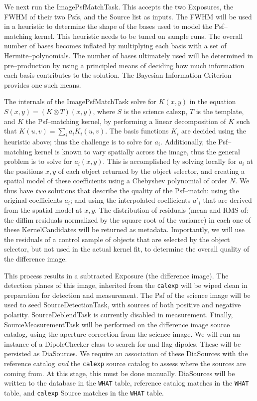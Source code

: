 \documentclass[12pt]{article}
\begin{document}
We next run the ImagePsfMatchTask.  This accepts the two Exposures,
the FWHM of their two Psfs, and the Source list as inputs.  The FWHM
will be used in a heuristic to determine the shape of the bases used
to model the Psf--matching kernel.  This heuristic needs to be tuned
on sample runs.  The overall number of bases becomes inflated by
multiplying each basis with a set of Hermite--polynomials.  The number
of bases ultimately used will be determined in pre--production by
using a principled means of deciding how much information each basis
contributes to the solution.  The Bayesian Information Criterion
provides one such means.

The internals of the ImagePsfMatchTask solve for $K(x,y)$ in the
equation $S(x,y) = (K \otimes T)(x,y)$, where $S$ is the science
calexp, $T$ is the template, and $K$ the Psf--matching kernel, by
performing a linear decomposition of $K$ such that $K(u,v) = \sum_i
a_i K_i(u,v)$.  The basis functions $K_i$ are decided using the
heuristic above; thus the challenge is to solve for $a_i$.
Additionally, the Psf--matching kernel is known to vary spatially
across the image, thus the general problem is to solve for $a_i(x,y)$.
This is accomplished by solving locally for $a_i$ at the positions
$x,y$ of each object returned by the object selector, and creating a
spatial model of these coefficients using a Chebyshev polynomial of
order $N$.  We thus have {\it two} solutions that describe the quality
of the Psf--match: using the original coefficients $a_i$; and using
the interpolated coefficients $a{'}_i$ that are derived from the
spatial model at $x,y$.  The distribution of residuals (mean and RMS
of: the diffim residuals normalized by the square root of the
variance) in each one of these KernelCandidates will be returned as
metadata.  Importantly, we will use the residuals of a control sample
of objects that are selected by the object selector, but not used in
the actual kernel fit, to determine the overall quality of the
difference image.

This process results in a subtracted Exposure (the difference image).
The detection planes of this image, inherited from the {\tt calexp}
will be wiped clean in preparation for detection and measurement.  The
Psf of the science image will be used to seed SourceDetectionTask,
with sources of both positive and negative polarity.
SourceDeblendTask is currently disabled in measurement.  Finally,
SourceMeasurementTask will be performed on the difference image source
catalog, using the aperture correction from the science image.  We
will run an instance of a DipoleChecker class to search for and flag
dipoles.  These will be persisted as DiaSources.  We require an
association of these DiaSources with the reference catalog {\it and}
the {\tt calexp} source catalog to assess where the sources are coming
from.  At this stage, this must be done manually.  DiaSources will be
written to the database in the {\tt WHAT} table, reference catalog
matches in the {\tt WHAT} table, and {\tt calexp} Source matches in
the {\tt WHAT} table.
\end{document}
